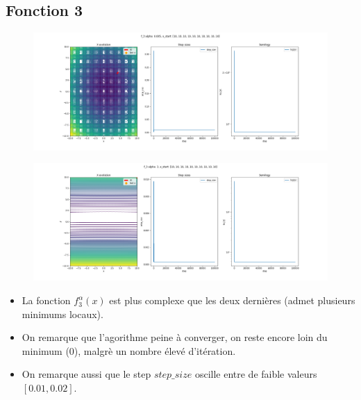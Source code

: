 \documentclass[twoside,10pt,a4paper]{article}
\numberwithin{equation}{section}					%
\numberwithin{figure}{section}						%
\begin{document}
\subsection{Fonction 3 }\label{sec:subsection2}
\begin{figure}[H]
    \centering
    \includegraphics[width=\textwidth]{imgs/adaptatif_sz/f_3_a-0.005_adaptatif.png}
    \caption{}
\end{figure}
\begin{figure}[H]
    \centering
    \includegraphics[width=\textwidth]{imgs/adaptatif_sz/f_3_a-3_adaptatif.png}
    \caption{}
\end{figure}
\begin{itemize}
	\item La fonction $f_3^{\alpha}(x)$ est plus complexe que les deux dernières (admet plusieurs minimums locaux).
	\item On remarque que l'agorithme peine à converger, on reste encore loin du minimum (0), malgrè un nombre élevé d'itération.
	\item On remarque aussi que le step $step\_size$ oscille entre de faible valeurs $[0.01, 0.02]$.

\end{itemize}
\end{document}
